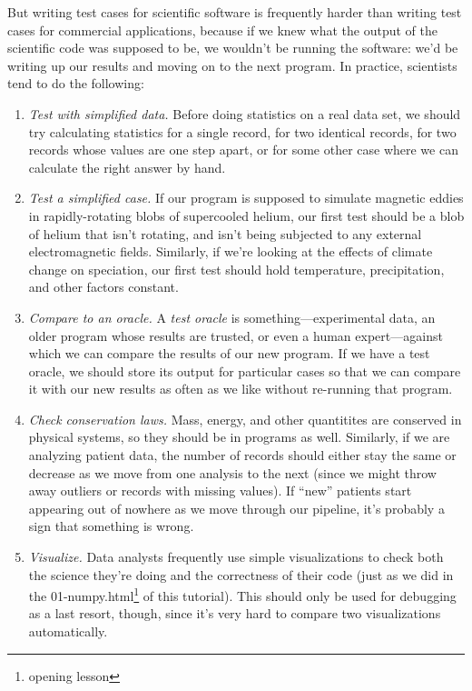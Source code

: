 \documentclass[]{book}
\newcommand{\urlfoot}[2]{{#1}\footnote{#2}}
\newcommand{\gdef}[2]{\emph{#2}}
\begin{document}
But writing test cases for scientific software is frequently harder than
writing test cases for commercial applications, because if we knew what
the output of the scientific code was supposed to be, we wouldn't be
running the software: we'd be writing up our results and moving on to
the next program. In practice, scientists tend to do the following:

\begin{enumerate}
\item
  \emph{Test with simplified data.} Before doing statistics on a real
  data set, we should try calculating statistics for a single record,
  for two identical records, for two records whose values are one step
  apart, or for some other case where we can calculate the right answer
  by hand.
\item
  \emph{Test a simplified case.} If our program is supposed to simulate
  magnetic eddies in rapidly-rotating blobs of supercooled helium, our
  first test should be a blob of helium that isn't rotating, and isn't
  being subjected to any external electromagnetic fields. Similarly, if
  we're looking at the effects of climate change on speciation, our
  first test should hold temperature, precipitation, and other factors
  constant.
\item
  \emph{Compare to an oracle.} A \gdef{g:test-oracle}{test oracle}
  is something---experimental data, an older program whose results are
  trusted, or even a human expert---against which we can compare the
  results of our new program. If we have a test oracle, we should store
  its output for particular cases so that we can compare it with our new
  results as often as we like without re-running that program.
\item
  \emph{Check conservation laws.} Mass, energy, and other quantitites
  are conserved in physical systems, so they should be in programs as
  well. Similarly, if we are analyzing patient data, the number of
  records should either stay the same or decrease as we move from one
  analysis to the next (since we might throw away outliers or records
  with missing values). If ``new'' patients start appearing out of
  nowhere as we move through our pipeline, it's probably a sign that
  something is wrong.
\item
  \emph{Visualize.} Data analysts frequently use simple visualizations
  to check both the science they're doing and the correctness of their
  code (just as we did in the \urlfoot{01-numpy.html}{opening lesson} of
  this tutorial). This should only be used for debugging as a last
  resort, though, since it's very hard to compare two visualizations
  automatically.
\end{enumerate}
\end{document}
